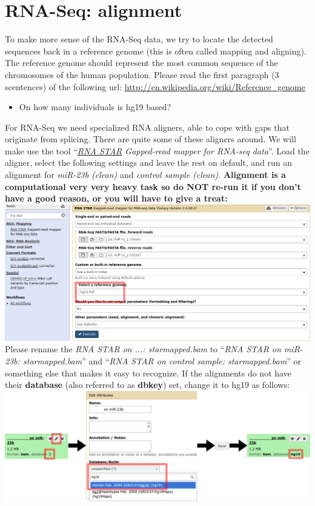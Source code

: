 \section{RNA-Seq: alignment}
To make more sense of the RNA-Seq data, we try to locate the detected sequences back in a reference genome (this is often called mapping and aligning).
The reference genome should represent the most common sequence of the chromosomes of the human population.
Please read the first paragraph (3 scentences) of the following url: \url{http://en.wikipedia.org/wiki/Reference_genome}
\begin{itemize}
	\item On how many individuals is hg19 based?
\end{itemize}
For RNA-Seq we need specialized RNA aligners, able to cope with gaps that originate from splicing.
There are quite some of these aligners around. We will make use the tool ``\textit{\underline{RNA STAR} Gapped-read mapper for RNA-seq data}''.
Load the aligner, select the following settings and leave the rest on default, and run an alignment for \textit{miR-23b (clean)} and \textit{control sample (clean)}. \textbf{Alignment is a computational very very heavy task so do NOT re-run it if you don't have a good reason, or you will have to give a treat:}\\
\includegraphics[width=\textwidth]{figures/alignment_01.png}\\
Please rename the \textit{RNA STAR on ...: starmapped.bam} to ``\textit{RNA STAR on miR-23b: starmapped.bam}'' and ``\textit{RNA STAR on control sample: starmapped.bam}'' or something else that makes it easy to recognize.
If the alignments do not have their \textbf{database} (also referred to as \textbf{dbkey}) set, change it to hg19 as follows:\\
\includegraphics[width=\textwidth]{figures/alignment_02.png}\\
